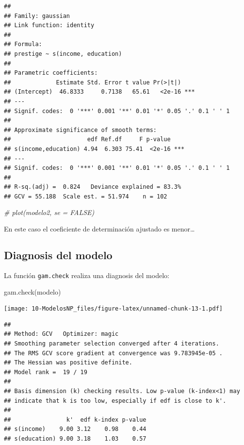 \documentclass[
]{book}
\newenvironment{Shaded}{\begin{snugshade}}{\end{snugshade}}
\newcommand{\CommentTok}[1]{\textcolor[rgb]{0.56,0.35,0.01}{\textit{#1}}}
\newcommand{\FunctionTok}[1]{\textcolor[rgb]{0.00,0.00,0.00}{#1}}
\newcommand{\NormalTok}[1]{#1}
\theoremstyle{break}
\theoremstyle{nonumberplain}
\begin{document}
\begin{verbatim}
## 
## Family: gaussian 
## Link function: identity 
## 
## Formula:
## prestige ~ s(income, education)
## 
## Parametric coefficients:
##             Estimate Std. Error t value Pr(>|t|)    
## (Intercept)  46.8333     0.7138   65.61   <2e-16 ***
## ---
## Signif. codes:  0 '***' 0.001 '**' 0.01 '*' 0.05 '.' 0.1 ' ' 1
## 
## Approximate significance of smooth terms:
##                      edf Ref.df     F p-value    
## s(income,education) 4.94  6.303 75.41  <2e-16 ***
## ---
## Signif. codes:  0 '***' 0.001 '**' 0.01 '*' 0.05 '.' 0.1 ' ' 1
## 
## R-sq.(adj) =  0.824   Deviance explained = 83.3%
## GCV = 55.188  Scale est. = 51.974    n = 102
\end{verbatim}

\begin{Shaded}
\begin{Highlighting}[]
\CommentTok{\# plot(modelo2, se = FALSE)}
\end{Highlighting}
\end{Shaded}

En este caso el coeficiente de determinación ajustado es menor\ldots{}

\hypertarget{diagnosis-del-modelo-2}{%
\subsection{Diagnosis del modelo}\label{diagnosis-del-modelo-2}}

La función \texttt{gam.check} realiza una diagnosis del modelo:

\begin{Shaded}
\begin{Highlighting}[]
\FunctionTok{gam.check}\NormalTok{(modelo)}
\end{Highlighting}
\end{Shaded}

\texttt{[image: 10-ModelosNP\_files/figure-latex/unnamed-chunk-13-1.pdf]}

\begin{verbatim}
## 
## Method: GCV   Optimizer: magic
## Smoothing parameter selection converged after 4 iterations.
## The RMS GCV score gradient at convergence was 9.783945e-05 .
## The Hessian was positive definite.
## Model rank =  19 / 19 
## 
## Basis dimension (k) checking results. Low p-value (k-index<1) may
## indicate that k is too low, especially if edf is close to k'.
## 
##                k'  edf k-index p-value
## s(income)    9.00 3.12    0.98    0.44
## s(education) 9.00 3.18    1.03    0.57
\end{verbatim}
\end{document}
